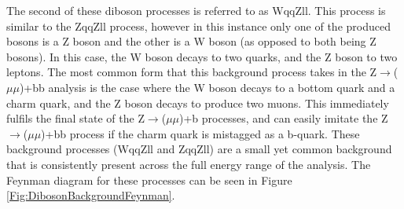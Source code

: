 \documentclass[12pt,a4paper,epsf,portrait,times,epsfig]{report}
\begin{document}
		The second of these diboson processes is referred to as WqqZll. This process is similar to the ZqqZll process, however in this instance only one of the produced bosons is a Z boson and the other is a W boson (as opposed to both being Z bosons). In this case, the W boson decays to two quarks, and	the Z boson to two leptons. The most common form that this background process takes in the Z$\rightarrow$($\mu\mu$)+bb analysis is the case where the W boson decays to a bottom quark and a charm quark, and the Z boson decays to produce two muons. This immediately fulfils the
		final state of the Z$\rightarrow$($\mu\mu$)+b processes, and can easily imitate the Z$\rightarrow$($\mu\mu$)+bb process if the charm quark is mistagged as a b-quark. These background processes (WqqZll and ZqqZll) are a small yet common background that is consistently present across the full energy range of the analysis. The Feynman diagram for these processes can be seen in Figure \ref{Fig:DibosonBackgroundFeynman}. \par
		
\end{document}
